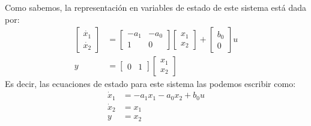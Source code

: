 \documentclass[]{scrartcl}
\begin{document}
Como sabemos, la representación en variables de estado de este sistema está dada por:
\begin{align*}
	\begin{bmatrix}
		\dot{x_1} \\
		\dot{x_2}
	\end{bmatrix}&=
	\begin{bmatrix}
		-a_1 & -a_0  \\
		1 & 0
	\end{bmatrix}	
	\begin{bmatrix}
		 x_1 \\
		 x_2
	\end{bmatrix} + 
		\begin{bmatrix}
		b_0 \\
		0
	\end{bmatrix} u 	\\
	y &= \begin{bmatrix}
		0 & 1
	\end{bmatrix}
		\begin{bmatrix}
		x_1 \\
		x_2
	\end{bmatrix}
\end{align*}
Es decir, las ecuaciones de estado para este sistema las podemos escribir como:
\begin{align}
	\dot{x}_1&= -a_1 x_1 -a_0  x_2 + b_0 u\nonumber\\
	\dot{x}_2&= x_1\nonumber\\
	y&=x_2\label{equ:est2orden}
\end{align}
\end{document}
